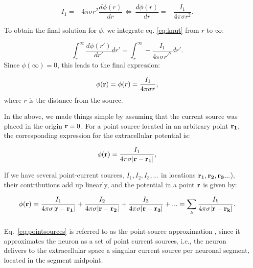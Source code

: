 \begin{equation}
I_1 = -4\pi \sigma r^2  \frac{d\phi(r)}{dr} \, \iff \, \frac{d\phi(r)}{dr} = -\frac{I_1}{4\pi \sigma r^2 }.
\label{eq:knut}
\end{equation}

To obtain the final solution for $\phi$, we integrate eq. \ref{eq:knut} from $r$ to $\infty$:

\begin{equation}
\int_r^{\infty} \frac{d\phi(r')}{dr'} dr' = \int_r^{\infty} -\frac{I_1}{4\pi \sigma r'^2 } dr'.
\label{eq:knut2}
\end{equation}
Since $\phi({\infty}) = 0$, this leads to the final expression:

\begin{equation}
\phi({\bf r}) = \phi(r) = \frac{I_1}{4\pi \sigma r},
\label{eq:pointsource}
\end{equation}
where $r$ is the distance from the source.

In the above, we made things simple by assuming that the current source was placed in the origin ${\bf r} = 0$. For a point source located in an arbitrary point ${\bf r_1} $, the corresponding expression for the extracellular potential is:

\begin{equation}
\phi({\bf r}) = \frac{I_1}{4\pi \sigma |{\bf r-r_1}|},
\label{eq:pointsource2}
\end{equation}

If we have several point-current sources, $I_{1}, I_2, I_3, ... $ in locations ${\bf r_1}, {\bf r_2}, {\bf r_3} ... $), their contributions add up linearly, and the potential in a point ${\bf r}$ is given by:

\begin{equation}
\phi({\bf r}) = \frac{I_1}{4\pi  \sigma {\bf |r-r_1|}} + \frac{I_2}{4\pi  \sigma {\bf |r-r_2|} } + \frac{I_3}{4\pi  \sigma {\bf |r-r_3|} } + ... = \sum_k \frac{I_k}{4\pi  \sigma {\bf |r-r_k|} }.
\label{eq:pointsources}
\end{equation}


\subsubsection{}
Eq.~\ref{eq:pointsources} is referred to as the point-source approximation \citep{Holt1999, Pettersen2008a}, since it approximates the neuron as a set of point current sources, i.e., the neuron delivers to the extracellular space a singular current source per neuronal segment, located in the segment midpoint. 

